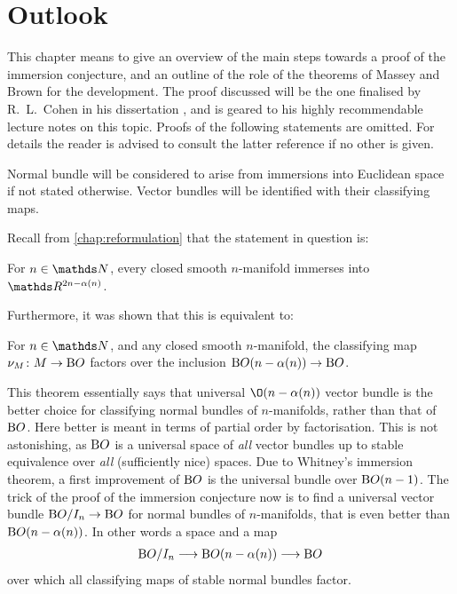 % 

\chapter{Outlook}\label{chap:outlook}
This chapter means to give an overview of the main steps towards a
proof of the immersion conjecture, and an outline of the role of
the theorems of Massey and Brown for the development.
The proof discussed will be the one finalised by R.~L.~Cohen in
his dissertation \cite{cohen}, and is geared to his highly
recommendable lecture notes \cite{immersionconj} on this topic.
Proofs of the following statements are omitted. For details the reader
is advised to consult the latter reference if no other is given.

Normal bundle will be considered to arise from immersions into
Euclidean space if not stated otherwise. 
Vector bundles will be identified with their classifying maps.

Recall from \autoref{chap:reformulation} that the statement in
question is:
\begin{Thm*}
  For $n\in\Nat$, every closed smooth $n$-manifold immerses into
  $\R^{2n-\alpha(n)}$.
\end{Thm*}
Furthermore, it was shown that this is equivalent to:
\begin{Thm*}
  For $n\in\Nat$, and any closed smooth $n$-manifold,
  the classifying map $\nu_{M}\colon M\to\mathrm{B}O$ factors over the
  inclusion $\mathrm{B}O(n-\alpha(n))\to\mathrm{B}O$.
\end{Thm*}
This theorem essentially says that universal $\O(n-\alpha(n))$ vector
bundle is the better choice for classifying normal bundles of
$n$-manifolds, rather than that of $\mathrm{B}O$. Here better is meant in
terms of partial order by factorisation.
This is not astonishing, as $\mathrm{B}O$ is a 
universal space of \emph{all} vector bundles up to stable
equivalence over \emph{all} (sufficiently nice) spaces.
Due to Whitney's immersion theorem, a first improvement of $\mathrm{B}O$ is
the universal bundle over $\mathrm{B}O(n-1)$.
The trick of the proof of the immersion conjecture now is to
find a universal vector bundle $\mathrm{B}O/I_{n}\to\mathrm{B}O$ for normal
bundles of $n$-manifolds, that is even better than
$\mathrm{B}O(n-\alpha(n))$. In other words a space and a map
\begin{gather*}
  \mathrm{B}O/I_{n}\longrightarrow\mathrm{B}O(n-\alpha(n))\longrightarrow\mathrm{B}O
\end{gather*}
over which  all classifying maps of stable normal bundles factor.

